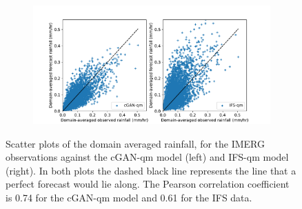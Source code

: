 \documentclass{article}
\begin{document}
\begin{figure}
\centering
     \begin{subfigure}{\textwidth}
    \centering
     \includegraphics[width=\textwidth]{images/scatter_mean_final-nologs_217600.pdf}
     \caption{}
     \end{subfigure}
     \caption{Scatter plots of the domain averaged rainfall, for the IMERG observations against the cGAN-qm model (left) and IFS-qm model (right). In both plots the dashed black line represents the line that a perfect forecast would lie along. The Pearson correlation coefficient is 0.74 for the cGAN-qm model and 0.61 for the IFS data.}
     \label{fig:bias}
\end{figure}
\end{document}
